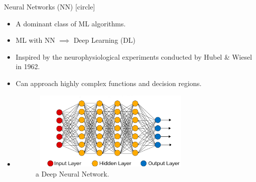 \begin{frame}{Neural Networks (NN)}
    [circle]
    \begin{itemize}
        \item{A dominant class of ML algorithms.}
        \vspace{0.2cm}
        \item{ML with NN $\implies$ Deep Learning (DL)}
        \vspace{0.2cm}
        \item{Inspired by the neurophysiological experiments conducted by Hubel \& Wiesel in 1962.}
        \vspace{0.2cm}
        \item{Can approach highly complex functions and decision regions.}
        \vspace{0.2cm}
        \item[]{
        \begin{figure}[H]
            \centering
            \includegraphics[width=8cm,height=3.8cm]{images/dnn.png}
            \caption{a Deep Neural Network.}
            \label{fig:dnn}
        \end{figure}}
    \end{itemize}
\end{frame}


